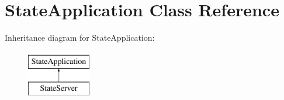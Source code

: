 \hypertarget{class_state_application}{\section{State\-Application Class Reference}
\label{class_state_application}
}
Inheritance diagram for State\-Application\-:\begin{figure}[H]
\begin{center}
\leavevmode
\includegraphics[height=2.000000cm]{class_state_application}
\end{center}
\end{figure}
